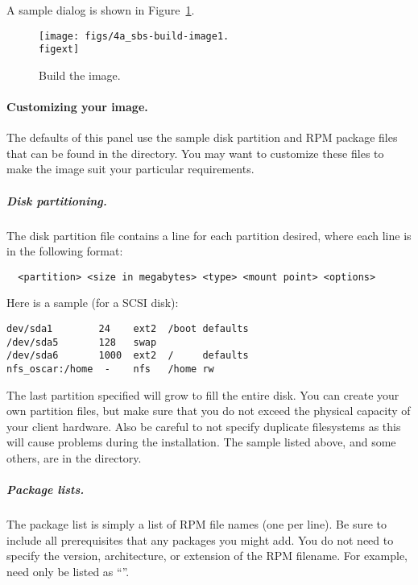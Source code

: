 A sample dialog is shown in Figure~\ref{fig:detailed-build-image}.

\begin{figure}[htbp]
  \begin{center}
    \texttt{[image: figs/4a\_sbs-build-image1.\\figext]}
    \caption{Build the image.}
    \label{fig:detailed-build-image}
  \end{center}
\end{figure}
  
\paragraph{Customizing your image.}

The defaults of this panel use the sample disk partition and RPM
package files that can be found in the  directory.
You may want to customize these files to make the image suit your
particular requirements.

\subparagraph{Disk partitioning.}

The disk partition file contains a line for each partition desired,
where each line is in the following format:

\begin{verbatim}
  <partition> <size in megabytes> <type> <mount point> <options>
\end{verbatim}

Here is a sample (for a SCSI disk):

\begin{verbatim}
dev/sda1        24    ext2  /boot defaults
/dev/sda5       128   swap
/dev/sda6       1000  ext2  /     defaults
nfs_oscar:/home  -    nfs   /home rw
\end{verbatim}

The last partition specified will grow to fill the entire disk.  You
can create your own partition files, but make sure that you do not
exceed the physical capacity of your client hardware. Also be careful
to not specify duplicate filesystems as this will cause problems 
during the installation. The sample listed above, and some others, 
are in the  directory.

\subparagraph{Package lists.}

The package list is simply a list of RPM file names (one per line). Be
sure to include all prerequisites that any packages you might add.
You do not need to specify the version, architecture, or extension of
the RPM filename.  For example,  need only
be listed as ``''.

